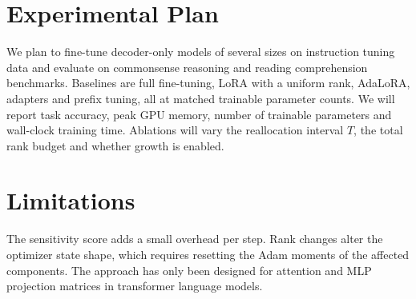 \documentclass{article}
\begin{document}
\section{Experimental Plan}
We plan to fine-tune decoder-only models of several sizes on instruction
tuning data and evaluate on commonsense reasoning and reading comprehension
benchmarks. Baselines are full fine-tuning, LoRA with a uniform rank, AdaLoRA,
adapters and prefix tuning, all at matched trainable parameter counts. We will
report task accuracy, peak GPU memory, number of trainable parameters and
wall-clock training time. Ablations will vary the reallocation interval $T$,
the total rank budget and whether growth is enabled.

\section{Limitations}
The sensitivity score adds a small overhead per step. Rank changes alter the
optimizer state shape, which requires resetting the Adam moments of the
affected components. The approach has only been designed for attention and
MLP projection matrices in transformer language models.
\end{document}
